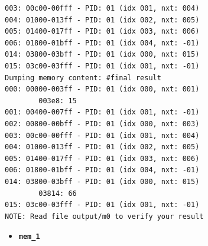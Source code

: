 \documentclass[a4paper]{article}
\numberwithin{equation}{section}
\begin{document}
\begin{mdframed}[leftline=false,rightline=false,backgroundcolor=teal!10,nobreak=false]
\begin{verbatim}
003: 00c00-00fff - PID: 01 (idx 001, nxt: 004)
004: 01000-013ff - PID: 01 (idx 002, nxt: 005)
005: 01400-017ff - PID: 01 (idx 003, nxt: 006)
006: 01800-01bff - PID: 01 (idx 004, nxt: -01)
014: 03800-03bff - PID: 01 (idx 000, nxt: 015)
015: 03c00-03fff - PID: 01 (idx 001, nxt: -01)
Dumping memory content: #final result
000: 00000-003ff - PID: 01 (idx 000, nxt: 001)
        003e8: 15
001: 00400-007ff - PID: 01 (idx 001, nxt: -01)
002: 00800-00bff - PID: 01 (idx 000, nxt: 003)
003: 00c00-00fff - PID: 01 (idx 001, nxt: 004)
004: 01000-013ff - PID: 01 (idx 002, nxt: 005)
005: 01400-017ff - PID: 01 (idx 003, nxt: 006)
006: 01800-01bff - PID: 01 (idx 004, nxt: -01)
014: 03800-03bff - PID: 01 (idx 000, nxt: 015)
        03814: 66
015: 03c00-03fff - PID: 01 (idx 001, nxt: -01)
NOTE: Read file output/m0 to verify your result
  \end{verbatim}
\end{mdframed}

\begin{itemize}
  \item \textbf{\texttt{mem_1}}
\end{itemize}
\end{document}
